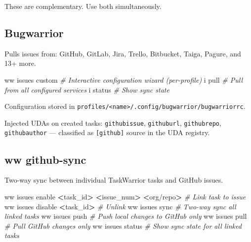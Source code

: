 \documentclass[
]{article}
\newenvironment{Shaded}{\begin{snugshade}}{\end{snugshade}}
\newcommand{\CommentTok}[1]{\textcolor[rgb]{0.56,0.35,0.01}{\textit{#1}}}
\newcommand{\ExtensionTok}[1]{#1}
\newcommand{\NormalTok}[1]{#1}
\newcommand{\OperatorTok}[1]{\textcolor[rgb]{0.81,0.36,0.00}{\textbf{#1}}}
\begin{document}
These are complementary. Use both simultaneously.

\subsection{Bugwarrior}\label{bugwarrior}

Pulls issues from: GitHub, GitLab, Jira, Trello, Bitbucket, Taiga,
Pagure, and 13+ more.

\begin{Shaded}
\begin{Highlighting}[]
\ExtensionTok{ww}\NormalTok{ issues custom          }\CommentTok{\# Interactive configuration wizard (per{-}profile)}
\ExtensionTok{i}\NormalTok{ pull                    }\CommentTok{\# Pull from all configured services}
\ExtensionTok{i}\NormalTok{ status                  }\CommentTok{\# Show sync state}
\end{Highlighting}
\end{Shaded}

Configuration stored in
\texttt{profiles/\textless{}name\textgreater{}/.config/bugwarrior/bugwarriorrc}.

Injected UDAs on created tasks: \texttt{githubissue},
\texttt{githuburl}, \texttt{githubrepo}, \texttt{githubauthor} ---
classified as \texttt{{[}github{]}} source in the UDA registry.

\subsection{ww github-sync}\label{ww-github-sync}

Two-way sync between individual TaskWarrior tasks and GitHub issues.

\begin{Shaded}
\begin{Highlighting}[]
\ExtensionTok{ww}\NormalTok{ issues enable }\OperatorTok{\textless{}}\NormalTok{task\_id}\OperatorTok{\textgreater{}} \OperatorTok{\textless{}}\NormalTok{issue\_num}\OperatorTok{\textgreater{}} \OperatorTok{\textless{}}\NormalTok{org/repo}\OperatorTok{\textgreater{}}    \CommentTok{\# Link task to issue}
\ExtensionTok{ww}\NormalTok{ issues disable }\OperatorTok{\textless{}}\NormalTok{task\_id}\OperatorTok{\textgreater{}}                          \CommentTok{\# Unlink}
\ExtensionTok{ww}\NormalTok{ issues sync                                        }\CommentTok{\# Two{-}way sync all linked tasks}
\ExtensionTok{ww}\NormalTok{ issues push                                        }\CommentTok{\# Push local changes to GitHub only}
\ExtensionTok{ww}\NormalTok{ issues pull                                        }\CommentTok{\# Pull GitHub changes only}
\ExtensionTok{ww}\NormalTok{ issues status                                      }\CommentTok{\# Show sync state for all linked tasks}
\end{Highlighting}
\end{Shaded}
\end{document}
